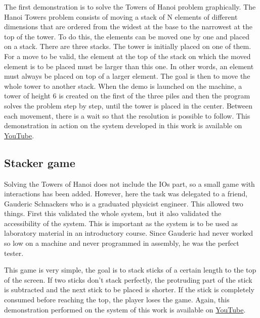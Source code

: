 The first demonstration is to solve the Towers of Hanoi problem graphically. The Hanoi Towers 
problem consists of moving a stack of N elements of different dimensions that are ordered from the 
widest at the base to the narrowest at the top of the tower. To do this, the elements can be moved 
one by one and placed on a stack.
 There are three stacks. The tower is initially placed on one of 
them. For a move to be valid, the element at the top of the stack on which the moved element is to 
be placed must be larger than this one. In other words, an element must always be placed on top of 
a larger element. The goal is then to move the whole tower to another stack. When the demo is 
launched on the machine, a tower of height 6 is created on the first of the three piles and then 
the program solves the problem step by step, until the tower is placed in the center. Between each 
movement, there is a wait so that the resolution is possible to follow. This demonstration in 
action on the system developed in this work is available on 
\href{https://www.youtube.com/watch?v=0W0SXzncl-Q}{YouTube}.

\subsection{Stacker game}

Solving the Towers of Hanoi does not include the IOs part, so a small game with interactions has 
been added. However, here the task was delegated to a friend, 
Gauderic Schnackers who is a graduated physicist engineer. This allowed two things. First this
validated the whole system, but it also validated the accessibility of the system. This is important 
as the system is to be used as laboratory material in an introductory course. Since Gauderic had 
never worked so low on a machine and never programmed in assembly, he was the perfect tester. 

This game is very simple, the goal is to stack sticks of a certain length to the top of the screen. 
If two sticks don't stack perfectly, the protruding part of the stick is subtracted and the next 
stick to be placed is shorter. If the stick is completely consumed before reaching the top, the 
player loses the game. Again, this demonstration performed on the system of this work is available 
on \href{https://www.youtube.com/watch?v=yHJDM_ckR1g}{YouTube}.
